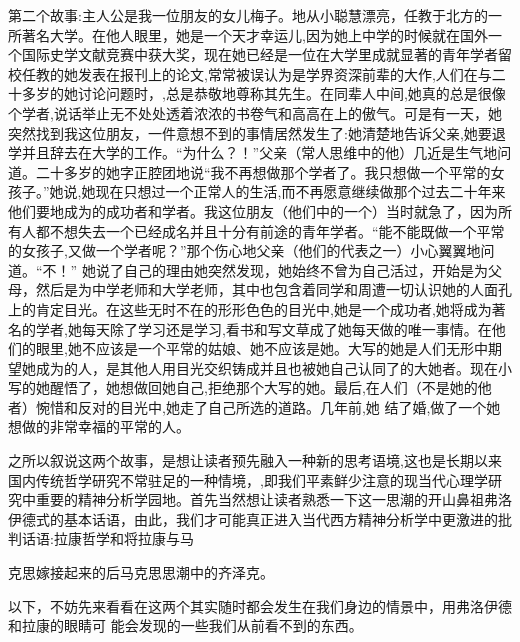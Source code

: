 \documentclass{article}
\begin{document}
第二个故事:主人公是我一位朋友的女儿梅子。地从小聪慧漂亮，任教于北方的一所著名大学。在他人眼里，她是一个天才幸运儿,因为她上中学的时候就在国外一个国际史学文献竞赛中获大奖，现在她已经是一位在大学里成就显著的青年学者留校任教的她发表在报刊上的论文,常常被误认为是学界资深前辈的大作,人们在与二十多岁的她讨论问题时，,总是恭敬地尊称其先生。在同辈人中间,她真的总是很像个学者,说话举止无不处处透着浓浓的书卷气和高高在上的傲气。可是有一天，她突然找到我这位朋友，一件意想不到的事情居然发生了:她清楚地告诉父亲,她要退学并且辞去在大学的工作。“为什么？！”父亲（常人思维中的他）几近是生气地问道。二十多岁的她字正腔团地说“我不再想做那个学者了。我只想做一个平常的女孩子。”她说,她现在只想过一个正常人的生活,而不再愿意继续做那个过去二十年来他们要地成为的成功者和学者。我这位朋友（他们中的一个）当时就急了，因为所有人都不想失去一个已经成名并且十分有前途的青年学者。“能不能既做一个平常的女孩子,又做一个学者呢？”那个伤心地父亲（他们的代表之一）小心翼翼地问道。“不！”
\newpage
她说了自己的理由她突然发现，她始终不曾为自己活过，开始是为父母，然后是为中学老师和大学老师，其中也包含着同学和周遭一切认识她的人面孔上的肯定目光。在这些无时不在的形形色色的目光中,她是一个成功者,她将成为著名的学者,她每天除了学习还是学习,看书和写文草成了她每天做的唯一事情。在他们的眼里,她不应该是一个平常的姑娘、她不应该是她。大写的她是人们无形中期望她成为的人，是其他人用目光交织铸成并且也被她自己认同了的大她者。现在小写的她醒悟了，她想做回她自己,拒绝那个大写的她。最后,在人们（不是她的他者）惋惜和反对的目光中,她走了自己所选的道路。几年前,她
结了婚,做了一个她想做的非常幸福的平常的人。 

之所以叙说这两个故事，是想让读者预先融入一种新的思考语境,这也是长期以来国内传统哲学研究不常驻足的一种情境，,即我们平素鲜少注意的现当代心理学研究中重要的精神分析学园地。首先当然想让读者熟悉一下这一思潮的开山鼻祖弗洛伊德式的基本话语，由此，我们才可能真正进入当代西方精神分析学中更激进的批判话语:拉康哲学和将拉康与马
\newpage

克思嫁接起来的后马克思思潮中的齐泽克。 

以下，不妨先来看看在这两个其实随时都会发生在我们身边的情景中，用弗洛伊德和拉康的眼睛可
能会发现的一些我们从前看不到的东西。 
\end{document}
